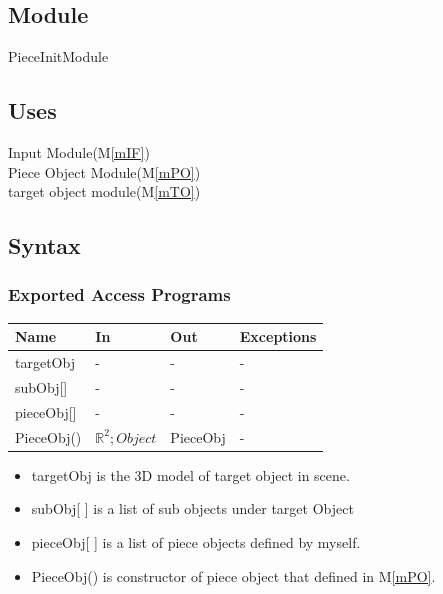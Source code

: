 \documentclass[12pt, titlepage]{article}
\newcommand{\mref}[1]{M\ref{#1}}
\begin{document}
\subsection{Module}

PieceInitModule

\subsection{Uses}

Input Module(\mref{mIF})\\
Piece Object Module(\mref{mPO})\\
target object module(\mref{mTO})\\

\subsection{Syntax}

\subsubsection{Exported Access Programs}

\begin{center}
	\begin{tabular}{p{2cm} p{4cm} p{4cm} p{2cm}}
		\hline
		\textbf{Name} & \textbf{In} & \textbf{Out} & \textbf{Exceptions} \\
		\hline
		targetObj & - & - & -\\
		subObj[] & - & - & -\\
		pieceObj[] & - & - & -\\
		PieceObj() & $\mathbb{R}^{2};Object$ & PieceObj & -\\
		\hline		
	\end{tabular}
\end{center}

\noindent
\begin{itemize}
	\item targetObj is the 3D model of target object in scene.
	\item subObj[ ] is a list of sub objects under target Object  
	\item pieceObj[ ] is a list of piece objects defined by myself.
	\item PieceObj() is constructor of piece object that defined in \mref{mPO}. \an{use \mref{mPO} here.}
\end{itemize}
\end{document}
